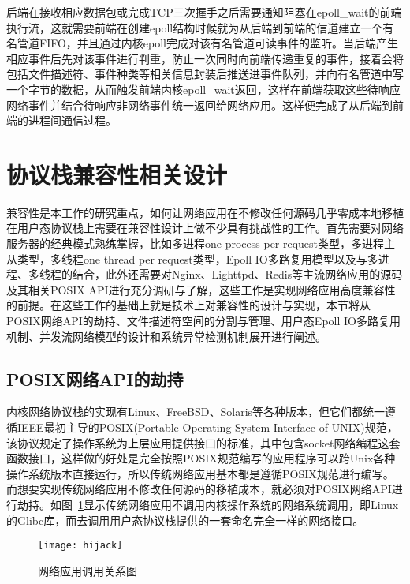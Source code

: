 后端在接收相应数据包或完成TCP三次握手之后需要通知阻塞在epoll\_wait的前端执行流，这就需要前端在创建epoll结构时候就为从后端到前端的信道建立一个有名管道FIFO，并且通过内核epoll完成对该有名管道可读事件的监听。当后端产生相应事件后先对该事件进行判重，防止一次同时向前端传递重复的事件，接着会将包括文件描述符、事件种类等相关信息封装后推送进事件队列，并向有名管道中写一个字节的数据，从而触发前端内核epoll\_wait返回，这样在前端获取这些待响应网络事件并结合待响应非网络事件统一返回给网络应用。这样便完成了从后端到前端的进程间通信过程。

\section{协议栈兼容性相关设计}

兼容性是本工作的研究重点，如何让网络应用在不修改任何源码几乎零成本地移植在用户态协议栈上需要在兼容性设计上做不少具有挑战性的工作。首先需要对网络服务器的经典模式熟练掌握，比如多进程one process per request类型，多进程主从类型，多线程one thread per request类型，Epoll IO多路复用模型以及与多进程、多线程的结合，此外还需要对Nginx、Lighttpd、Redis等主流网络应用的源码及其相关POSIX API进行充分调研与了解，这些工作是实现网络应用高度兼容性的前提。在这些工作的基础上就是技术上对兼容性的设计与实现，本节将从POSIX网络API的劫持、文件描述符空间的分割与管理、用户态Epoll IO多路复用机制、并发流网络模型的设计和系统异常检测机制展开进行阐述。

\subsection{POSIX网络API的劫持}

内核网络协议栈的实现有Linux、FreeBSD、Solaris等各种版本，但它们都统一遵循IEEE最初主导的POSIX(Portable Operating System Interface of UNIX)规范，该协议规定了操作系统为上层应用提供接口的标准，其中包含socket网络编程这套函数接口，这样做的好处是完全按照POSIX规范编写的应用程序可以跨Unix各种操作系统版本直接运行，所以传统网络应用基本都是遵循POSIX规范进行编写。而想要实现传统网络应用不修改任何源码的移植成本，就必须对POSIX网络API进行劫持。如图~\ref{fig:hijack}显示传统网络应用不调用内核操作系统的网络系统调用，即Linux的Glibc库，而去调用用户态协议栈提供的一套命名完全一样的网络接口。

\vspace{-10pt}
\begin{figure}[H] %
  \centering
  \texttt{[image: hijack]}
  \caption{网络应用调用关系图}
  \label{fig:hijack}
\end{figure}
\vspace{-10pt}

